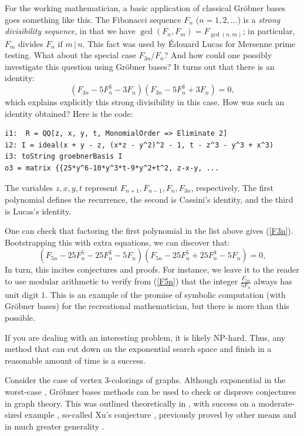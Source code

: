 
For the working mathematician, a basic application of classical Gr\"obner bases goes something like this.  The Fibonacci sequence $F_n$ ($n= 1, 2, \ldots$) is a \textit{strong divisibility sequence}, in that we have $\gcd(F_n, F_m) = F_{\gcd(n,m)}$; in particular, $F_m$ divides $F_n$ if $m \, | \, n$.  This fact was used by \'Edouard Lucas for Mersenne prime testing.  What about the special case $F_{3n}/F_n$?  And how could one possibly investigate this question using Gr\"obner bases?  It turns out that there is an identity:
\begin{equation}\label{F3n}
(F_{3n} - 5 F_n^3 - 3 F_n)(F_{3n} - 5 F_n^3 + 3 F_n) = 0,
\end{equation}
which explains explicitly this strong divisibility in this case.  How was such an identity obtained?  Here is the code:
\begin{M2}
\begin{verbatim}
i1:  R = QQ[z, x, y, t, MonomialOrder => Eliminate 2]
i2: I = ideal(x + y - z, (x*z - y^2)^2 - 1, t - z^3 - y^3 + x^3)
i3: toString groebnerBasis I
o3 = matrix {{25*y^6-10*y^3*t-9*y^2+t^2, z-x-y, ...
\end{verbatim}
\end{M2}  
\medskip
The variables $z,x,y,t$ represent $F_{n+1}, F_{n-1}, F_n, F_{3n}$, respectively.  The first polynomial defines the recurrence, the second is Cassini's identity, and the third is Lucas's identity.

One can check that factoring the first polynomial in the list above gives (\ref{F3n}).  Bootstrapping this with extra equations, we can discover that:
\begin{equation}\label{F5n}
(F_{5n} - 25 F_n^5 - 25 F_n^3 - 5 F_n)(F_{5n} - 25 F_n^5 + 25 F_n^3 - 5 F_n) = 0,
\end{equation}
In turn, this incites conjectures and proofs.  
For instance, we leave it to the reader to use modular arithmetic to verify from (\ref{F5n}) that the integer $\frac{F_{5n}}{5F_n}$ always has unit digit $1$.  This is an example of the promise of symbolic computation (with Gr\"obner bases) for the recreational mathematician, but there is more than this possible.

If you are dealing with an interesting problem, it is likely NP-hard.  Thus, any method that can cut down on the exponential search space and finish in a reasonable amount of time is a success.  

Consider the case of vertex 3-colorings of graphs.  Although exponential in the worst-case \cite[pp. 400]{yap2000fundamental}, Gr\"obner bases methods can be used to check or disprove conjectures in graph theory.  This was outlined theoretically in \cite{bayer1982division}, with success on a moderate-sized example \cite{hillar2008algebraic}, so-called Xu's conjecture \cite{shaoji1990size}, previously proved by other means and in much greater generality \cite{akbari2001kr}.

